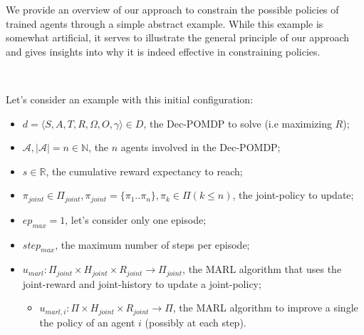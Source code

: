 \begin{proofoutline}\label{proof:jpc_to_ac}

    We provide an overview of our approach to constrain the possible policies of trained agents through a simple abstract example. While this example is somewhat artificial, it serves to illustrate the general principle of our approach and gives insights into why it is indeed effective in constraining policies.

    \

    \noindent Let's consider an example with this initial configuration:

    \begin{itemize}
        \item $d=\langle S,A,T,R,\Omega, O, \gamma \rangle \in D$, the Dec-POMDP to solve (i.e maximizing $R$);
        \item $\mathcal{A}, |\mathcal{A}| = n \in \mathbb{N}$, the  $n$ agents involved in the Dec-POMDP;
        \item $s \in \mathbb{R}$, the cumulative reward expectancy to reach;
        \item $\pi_{joint} \in \Pi_{joint}, \allowbreak \pi_{joint} = \{\pi_1..\pi_n\}, \pi_k \in \Pi (k \leq n)$, the joint-policy to update;
        \item $ep_{max} = 1$, let's consider only one episode;
        \item $step_{max}$, the maximum number of steps per episode;
        \item $u_{marl}: \Pi_{joint} \times H_{joint} \times R_{joint} \rightarrow \Pi_{joint}$, the MARL algorithm that uses the joint-reward and joint-history to update a joint-policy;
              \begin{itemize}
                  \item $u_{marl,i}: \Pi \times H_{joint} \times R_{joint} \rightarrow \Pi$, the MARL algorithm to improve a single the policy of an agent $i$ (possibly at each step).
              \end{itemize}
    \end{itemize}


\end{proofoutline}
